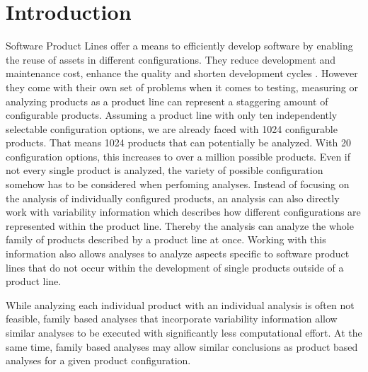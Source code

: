 \documentclass[a4paper]{article}
\begin{document}
\newpage
\lhead{{}}
\rhead{\leftmark}
\pagestyle{fancy}

\listoftodos[Notes]
\clearpage

\tableofcontents
\newpage


\maketitle
\newpage

\setcounter{page}{1}
\lhead{{}}
\rhead{\leftmark}
\pagestyle{fancy}



\section{Introduction}

Software Product Lines offer a means to efficiently develop software by enabling the reuse of assets in different configurations. They reduce development and maintenance cost, enhance the quality and shorten development cycles \cite{Pohl:2005:SPL:1095605} \cite{Apel:2013:FSP:2541773} \cite{spl-in-action}. However they come with their own set of problems when it comes to testing, measuring or analyzing products as a product line can represent a staggering amount of configurable products. Assuming a product line with only ten independently selectable configuration options, we are already faced with 1024 configurable products. That means 1024 products that can potentially be analyzed. With 20 configuration options, this increases to over a million possible products. Even if not every single product is analyzed, the variety of possible configuration somehow has to be considered when perfoming analyses. Instead of focusing on the analysis of individually configured products, an analysis can also directly work with variability information which describes how different configurations are represented within the product line. Thereby the analysis can analyze the whole family of products described by a product line at once. Working with this information also allows analyses to analyze aspects specific to software product lines that do not occur within the development of single products outside of a product line.

While analyzing each individual product with an individual analysis is often not feasible, family based analyses that incorporate variability information allow similar analyses to be executed with significantly less computational effort. At the same time, family based analyses may allow similar conclusions as product based analyses for a given product configuration. 
\end{document}
